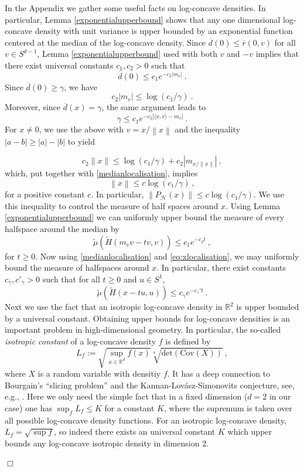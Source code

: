\documentclass[12pt]{article}
\newcommand{\R}{\mathbb{R}}
\newcommand{\wt}{\widetilde}
\newcommand{\ol}{\overline}
\newcommand{\qed}{\hfill $\Box$}
\newenvironment{proof}{\par\noindent{\bf Proof:}}{\qed \par\medskip\noindent}
\begin{document}
\begin{proof}
In the Appendix we gather some useful facts on log-concave densities.
In particular,  Lemma \ref{exponentialupperbound} shows that any one dimensional
 log-concave density with unit variance is upper bounded by an
 exponential
 function centered at the median of the log-concave density. Since
 $\ol{d}(0)\leq \ol{r}(0,v)$ for all $v\in S^{d-1}$, Lemma \ref{exponentialupperbound} used with both $v$ and $-v$
implies that there exist universal constants $c_1,c_2>0$ such that
\[
  \ol{d}(0) \leq c_1e^{-c_2 |m_v| }~.
\]
Since $\ol{d}(0)\geq\gamma$, we have
\begin{equation}\label{medianlocalisation}
 c_2|m_v|\leq \log(c_1/\gamma)~.
\end{equation}
Moreover, since $\ol{d}(x)=\gamma$, the same argument leads to 
\[
  \gamma \leq c_1 e^{-c_2|\langle x,v\rangle -m_v|}~.
\]  
For $x\neq 0$, we use the above with $v=x/\left\|x\right\|$ and the inequality $|a-b|\geq |a|-|b|$ to yield

$$ c_2\|x\| \leq \log(c_1/\gamma)+c_2 | m_{x/\|x\|}|~, $$
which, put together with \eqref{medianlocalisation}, implies
\begin{equation}\label{eq:xlocalisation}
\left\| x \right\| \leq c\log(c_1/\gamma)~,
\end{equation}
for a positive constant $c$. In particular, $\left\|
  P_{\mathcal{H}}(x)\right\|\leq c\log(c_1/\gamma)$.
We use this inequality to control the measure of half
spaces around $x$.
Using Lemma \ref{exponentialupperbound} we can uniformly upper bound
the measure of every halfspace around the median by
\[
  \wt\mu\left( \wt{H}(m_v v-tv,v)\right) \leq c_1e^{-c_2t}~,
\]
for $t\geq0$. Now using \eqref{medianlocalisation} and
\eqref{eq:xlocalisation}, we may uniformly bound the measure of
halfspaces around $x$. In particular, there exist constants
$c_{\gamma},c'_{\gamma}>0$ such that for all $t \geq 0$ and $u\in S^1$,
\begin{equation}
\label{half space weight up}
\wt\mu\left( \wt{H}\left( x- t u,u \right) \right)  \leq c_{\gamma} e^{-c_{\gamma}'t}~. 
\end{equation}
Next we use the fact that an isotropic log-concave
density in $\R^2$ is upper bounded by a universal constant. 
Obtaining upper bounds for log-concave densities is an important
problem in high-dimensional geometry. In particular, the so-called
\emph{isotropic constant} of a log-concave density $f$ is defined by
\[
  L_f:= \sqrt{\sup_{x\in\R^d} f(x)}  \sqrt[4]{\text{det}\left(
      \text{Cov}(X) \right)} ~,
\]
where $X$ is a random variable with densitiy $f$. It has a deep connection to Bourgain's ``slicing problem'' and the 
Kannan-Lovász-Simonovits 
conjecture, see, e.g., \cite{LUTWAK1993151,klartag2022bourgain}. Here we only need the simple fact that in a fixed dimension ($d=2$ in
our case) one has
$\sup_f L_f \leq K$
for a constant $K$, where the supremum is taken over all possible log-concave density functions. For an isotropic log-concave density, $L_f=\sqrt{\sup f}$, so indeed there exists an universal constant $K$ which upper bounds any log-concave isotropic density in dimension $2$.


\end{proof}
\end{document}
